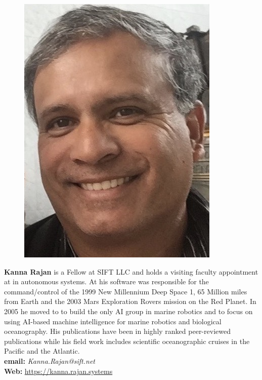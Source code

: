 \parbox{6.3in}{
\begin{figure} %
    \vspace{-\intextsep}
    \hspace*{-.35\columnsep}\includegraphics[scale=0.4]{fig/KRajan.jpg}
\end{figure}
\textbf{Kanna Rajan} is a Fellow at SIFT LLC and holds a visiting
faculty appointment at \univ in autonomous systems. At \inst his
software was responsible for the command/control of the 1999 New
Millennium Deep Space 1, 65 Million miles from Earth and the 2003 Mars
Exploration Rovers mission on the Red Planet. In 2005 he moved to \mba
to build the only AI group in marine robotics and to focus on using
AI-based machine intelligence for marine robotics and biological
oceanography. His publications have been in highly ranked
peer-reviewed publications while his field work includes scientific
oceanographic cruises in the Pacific and the Atlantic.
\\
\textbf{email: }\emph{Kanna.Rajan@sift.net}\\
\textbf{Web: }\url{https://kanna.rajan.systems} }

